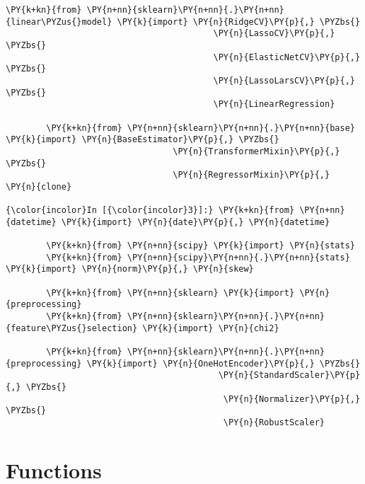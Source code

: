 \begin{Verbatim}[commandchars=\\\{\}]
        \PY{k+kn}{from} \PY{n+nn}{sklearn}\PY{n+nn}{.}\PY{n+nn}{linear\PYZus{}model} \PY{k}{import} \PY{n}{RidgeCV}\PY{p}{,} \PYZbs{}
                                         \PY{n}{LassoCV}\PY{p}{,} \PYZbs{}
                                         \PY{n}{ElasticNetCV}\PY{p}{,} \PYZbs{}
                                         \PY{n}{LassoLarsCV}\PY{p}{,} \PYZbs{}
                                         \PY{n}{LinearRegression}
        
        \PY{k+kn}{from} \PY{n+nn}{sklearn}\PY{n+nn}{.}\PY{n+nn}{base} \PY{k}{import} \PY{n}{BaseEstimator}\PY{p}{,} \PYZbs{}
                                 \PY{n}{TransformerMixin}\PY{p}{,} \PYZbs{}
                                 \PY{n}{RegressorMixin}\PY{p}{,} \PY{n}{clone}

{\color{incolor}In [{\color{incolor}3}]:} \PY{k+kn}{from} \PY{n+nn}{datetime} \PY{k}{import} \PY{n}{date}\PY{p}{,} \PY{n}{datetime}
        
        \PY{k+kn}{from} \PY{n+nn}{scipy} \PY{k}{import} \PY{n}{stats}
        \PY{k+kn}{from} \PY{n+nn}{scipy}\PY{n+nn}{.}\PY{n+nn}{stats} \PY{k}{import} \PY{n}{norm}\PY{p}{,} \PY{n}{skew}
        
        \PY{k+kn}{from} \PY{n+nn}{sklearn} \PY{k}{import} \PY{n}{preprocessing}
        \PY{k+kn}{from} \PY{n+nn}{sklearn}\PY{n+nn}{.}\PY{n+nn}{feature\PYZus{}selection} \PY{k}{import} \PY{n}{chi2}
        
        \PY{k+kn}{from} \PY{n+nn}{sklearn}\PY{n+nn}{.}\PY{n+nn}{preprocessing} \PY{k}{import} \PY{n}{OneHotEncoder}\PY{p}{,} \PYZbs{}
                                          \PY{n}{StandardScaler}\PY{p}{,} \PYZbs{}
                                           \PY{n}{Normalizer}\PY{p}{,} \PYZbs{}
                                           \PY{n}{RobustScaler}
\end{Verbatim}
\fi









    \section{Functions}\label{functions}

